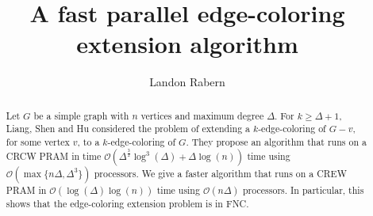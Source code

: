 \documentclass[12pt]{amsart}
\title{A fast parallel edge-coloring extension algorithm}
\author{Landon Rabern}
\theoremstyle{plain}
\theoremstyle{definition}
\theoremstyle{remark}
\begin{document}
\maketitle
\begin{abstract}
Let $G$ be a simple graph with $n$ vertices and maximum degree $\Delta$. For $k \ge \Delta + 1$, Liang, Shen and Hu \cite{liang1996parallel} considered the problem of extending a $k$-edge-coloring of $G-v$, for some vertex $v$, to a $k$-edge-coloring of $G$.  They propose an algorithm that runs on a CRCW PRAM in time $\mathcal{O}(\Delta^{\frac32}\log^3(\Delta) + \Delta\log(n))$ time using $\mathcal{O}(\max\{n\Delta, \Delta^3\})$ processors. We give a faster algorithm that runs on a CREW PRAM in $\mathcal{O}(\log(\Delta)\log(n))$ time using $\mathcal{O}(n\Delta)$ processors.  In particular, this shows that the edge-coloring extension problem is in FNC.
\end{abstract}




\end{document}
